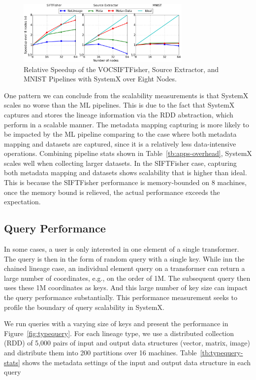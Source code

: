 \documentclass{sig-alternate}
\begin{document}
\begin{figure}[h]
\begin{center}
    \includegraphics[width=85mm]{pictures/Scalability}
\caption {Relative Speedup of the VOCSIFTFisher, Source Extractor, and MNIST Pipelines with SystemX over Eight Nodes.
    \label{fig:scalability}
}
\end{center}
\end{figure}

One pattern we can conclude from the scalability measurements is that SystemX scales no worse than the ML pipelines.
This is due to the fact that SystemX captures and stores the lineage information via the RDD abstraction, which perform
in a scalable manner. 
The metadata mapping capturing is more likely to be impacted by the ML pipeline comparing to the case where both metadata
mapping and datasets are captured, since it is a relatively less data-intensive operations.
Combining pipeline stats shown in Table~\ref{tb:apps-overhead}, SystemX scales  well when collecting larger datasets.
In the SIFTFisher case, capturing both metadata mapping and datasets shows scalability that is higher than ideal.
This is because the SIFTFisher performance is memory-bounded on 8 machines, once the memory bound is relieved, the actual performance
exceeds the expectation.

\subsection{Query Performance}
In some cases, a user is only interested in one element of a single transformer.
The query is then in the form of random query with a single key.
While inn the chained lineage case, an individual element query on a transformer can return a large number of coordinates, e.g., on the order of 1M. 
The subsequent query then uses these 1M coordinates as keys.
And this large number of key size can impact the query performance substantially.  
This performance measurement seeks to profile the boundary of query scalability in SystemX. 

We run queries with a varying size of keys
and present the performance in Figure~\ref{fig:typequery}. For each lineage type, we use a distributed collection (RDD) of 5,000 pairs of 
input and output data structures (vector, matrix, image) and distribute them into 200 partitions over 16 machines.
Table~\ref{tb:typequery-stats} shows the metadata settings of the input and output data structure in each query
\end{document}
